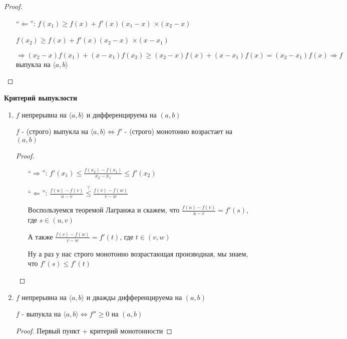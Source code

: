 \begin{theorem-non}
\begin{proof}
\begin{itemize}
            Для доказательства со строгим знаком и строгой монотоннсотью тут нужно плясать с 
            \href{https://youtu.be/CAxh8kYEOlQ?t=6638}{бубном}. Пихнуть между $u$ и $x$ еще одну точку. Например $v$.
            И тогда уже получить неравенство со строгими знаками: $\frac{f(u) - f(x_0)}{u - x_0} < \frac{f(v) - f(x_0)}{v - x_0}< \frac{f(x) - f(x_0)}{x - x_0}$
            \item[``$\Longleftarrow$'':] $f(x_1) \geqslant f(x) + f'(x)(x_1 - x)$ \quad $\times (x_2 - x)$
             
            $f(x_2) \geqslant f(x) + f'(x)(x_2 - x)$ \quad $\times (x - x_1)$

            $\Longrightarrow (x_2 - x)f(x_1) + (x - x_1)f(x_2) \geqslant
            (x_2 - x)f(x) + (x - x_1)f(x) = (x_2 - x_1)f(x) \Longrightarrow f$ выпукла на $\langle a, b \rangle$
        \end{itemize}
    \end{proof}
\end{theorem-non}
\textbf{Критерий выпуклости} 

\begin{enumerate}
    \item $f$ непрерывна на $\langle a, b \rangle$ и дифференцируема на $(a, b)$
    
    $f$ - (строго) выпукла на $\langle a, b \rangle \Longleftrightarrow f'$ - (строго) монотонно возрастает на $(a, b)$
    
    \begin{proof} \quad 

        \begin{enumerate}
            \item[``$\Longrightarrow$'':] $f'(x_1) \leqslant \frac{f(x_2) - f(x_1)}{x_2 - x_1} \leqslant f'(x_2)$
            \item[``$\Longleftarrow$'':] $\frac{f(u) - f(v)}{u - v} \overset{?}{\leqslant} \frac{f(v) - f(w)}{v - w}$
            
            Воспользуемся теоремой Лагранжа и скажем, что $\frac{f(u) - f(v)}{u - v} = f'(s)$, где $s \in (u, v)$ 

            А также $\frac{f(v) - f(w)}{v - w} = f'(t)$, где $t \in (v, w)$ 

            Ну а раз у нас строго монотонно возрастающая производная, мы знаем, что $f'(s) \leqslant f'(t)$
        \end{enumerate}
    \end{proof}

    \item $f$ непрерывна на $\langle a, b \rangle$ и дважды дифференцируема на $(a, b)$
    
    $f$ - выпукла на $\langle a, b \rangle \Longleftrightarrow f'' \geqslant 0$ на $(a, b)$
    
    \begin{proof}
        Первый пункт + критерий монотонности 
    \end{proof}
\end{enumerate}

